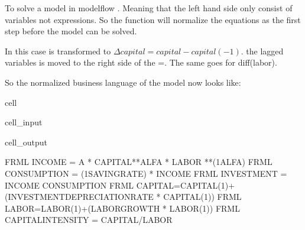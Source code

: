 \documentclass[letterpaper,10pt,english]{jupyterBook}
\begin{document}
\sphinxAtStartPar
To solve a model in modelflow . Meaning that the left hand side only consist of variables not expressions. So the function  will normalize the equations as the first step before the model can be solved.

\sphinxAtStartPar
In this case   is transformed to \(\Delta capital = capital-capital(-1)\).  the lagged variables is moved to the right side of the =.
The same goes for diff(labor).

\sphinxAtStartPar
So the normalized business language of the model now looks like:

\begin{sphinxuseclass}{cell}\begin{sphinxVerbatimInput}

\begin{sphinxuseclass}{cell_input}
\begin{sphinxVerbatim}[commandchars=\\\{\}]
\end{sphinxVerbatim}

\end{sphinxuseclass}\end{sphinxVerbatimInput}
\begin{sphinxVerbatimOutput}

\begin{sphinxuseclass}{cell_output}
\begin{sphinxVerbatim}[commandchars=\\\{\}]
FRML \PYGZlt{}\PYGZgt{} INCOME          = A  * CAPITAL**ALFA * LABOR **(1\PYGZhy{}ALFA)  \PYGZdl{}
FRML \PYGZlt{}\PYGZgt{} CONSUMPTION     = (1\PYGZhy{}SAVING\PYGZus{}RATE)  * INCOME  \PYGZdl{}
FRML \PYGZlt{}\PYGZgt{} INVESTMENT      = INCOME \PYGZhy{} CONSUMPTION  \PYGZdl{}
FRML \PYGZlt{}\PYGZgt{} CAPITAL=CAPITAL(\PYGZhy{}1)+(INVESTMENT\PYGZhy{}DEPRECIATION\PYGZus{}RATE * CAPITAL(\PYGZhy{}1))\PYGZdl{}
FRML \PYGZlt{}\PYGZgt{} LABOR=LABOR(\PYGZhy{}1)+(LABOR\PYGZus{}GROWTH * LABOR(\PYGZhy{}1))\PYGZdl{}
FRML \PYGZlt{}\PYGZgt{} CAPITAL\PYGZus{}INTENSITY = CAPITAL/LABOR  \PYGZdl{}
\end{sphinxVerbatim}

\end{sphinxuseclass}\end{sphinxVerbatimOutput}

\end{sphinxuseclass}
\end{document}
